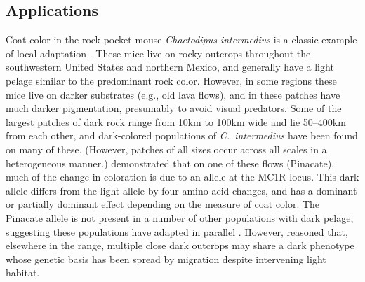 \documentclass[10pt,letterpaper]{article}
\newcommand{\citep}[1]{\cite{#1}}
\newcommand{\citet}[1]{\cite{#1}}
\begin{document}
\subsection*{Applications} 
\label{ss:applications}
%
% 

Coat color in the rock pocket mouse
\emph{Chaetodipus intermedius} is a classic example of local
adaptation 
\citep{benson1933concealing,DiceBlossom1937}.
These mice live on rocky outcrops throughout the southwestern United States and northern Mexico, 
and generally have a light pelage similar to the predominant rock color.
However, in some regions these mice live on darker substrates (e.g., old lava flows),
and in these patches have much darker pigmentation, 
presumably to avoid visual predators.
Some of the largest patches of dark rock range from 10km to 100km wide
and lie 50--400km from each other,
and dark-colored populations of \emph{C.\ intermedius} have been found on many of these.
(However, patches of all sizes occur across all scales in a heterogeneous manner.)
\citet{nachman2003genetic} demonstrated that on one of these flows (Pinacate), 
much of the change in coloration is due to an allele at the MC1R locus.
This dark allele differs from the light allele by four amino acid changes, 
and has a dominant or partially dominant effect depending on the measure of coat color.
The Pinacate allele is not present in a number of other populations with dark pelage,
suggesting these populations have adapted in parallel \citep{nachman2003genetic,hoekstra2003different}.
However, \citet{hoekstra2004local} reasoned that, elsewhere in the range, 
multiple close dark outcrops may share a dark phenotype whose genetic basis has been spread by migration
despite intervening light habitat. 
\end{document}
